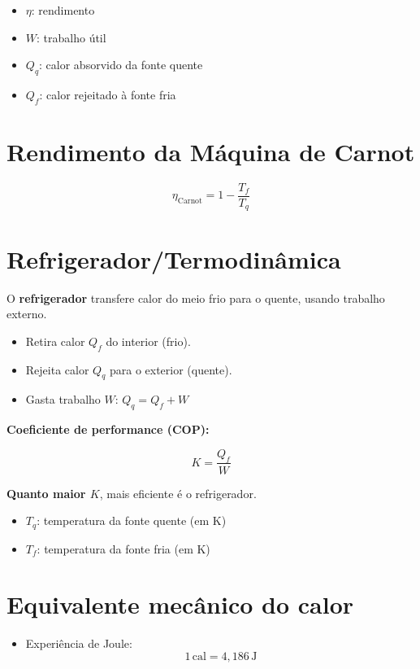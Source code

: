 \documentclass[a4paper,12pt]{article}
\begin{document}
\begin{multicols}{2}
\begin{itemize}
  \item \( \eta \): rendimento
  \item \( W \): trabalho útil
  \item \( Q_q \): calor absorvido da fonte quente
  \item \( Q_f \): calor rejeitado à fonte fria
\end{itemize}

\section{Rendimento da Máquina de Carnot}

\[
\eta_{\text{Carnot}} = 1 - \frac{T_f}{T_q}
\]

\section{Refrigerador/Termodinâmica}

O \textbf{refrigerador} transfere calor do meio frio para o quente, usando trabalho externo.

\begin{itemize}
  \item Retira calor \( Q_f \) do interior (frio).
  \item Rejeita calor \( Q_q \) para o exterior (quente).
  \item Gasta trabalho \( W \): \quad \( Q_q = Q_f + W \)
\end{itemize}

\textbf{Coeficiente de performance (COP):}

\[
K = \frac{Q_f}{W}
\]

\textbf{Quanto maior \( K \)}, mais eficiente é o refrigerador.

\begin{itemize}
  \item \( T_q \): temperatura da fonte quente (em K)
  \item \( T_f \): temperatura da fonte fria (em K)
\end{itemize}

\section{Equivalente mecânico do calor}
\begin{itemize}
    \item Experiência de Joule:
    \begin{equation*}
        1 \, \text{cal} = 4{,}186 \, \text{J}
    \end{equation*}
\end{itemize}


\end{multicols}
\end{document}
